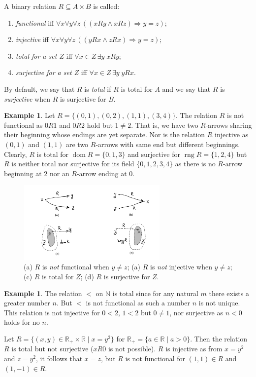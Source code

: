 \documentclass[12pt,notitlepage]{article}
\theoremstyle{plain}
\theoremstyle{definition}
\newtheorem{exm}[thm]{Example}
\theoremstyle{plain}
\newcommand{\N}{\mathbb{N}}
\newcommand{\R}{\mathbb{R}}
\newcommand{\sbs}{\subseteq}
\newcommand{\dom}{\mathop{\mathrm{dom}}}
\newcommand{\rng}{\mathop{\mathrm{rng}}}
\newcommand{\1}{\mathbf{1}}
\newcommand{\0}{\mathbf{0}}
\newcommand{\ply}{\Longrightarrow}
\begin{document}
A binary relation $R \sbs A \times B$ is called:
\begin{enumerate}
\item \emph{functional} iff $\forall x \forall y \forall z\, ( (x R y \wedge x R z) \ply y = z )$;
\item \emph{injective} iff $\forall x \forall y \forall z\, ( (y R x \wedge z R x) \ply y = z )$;
\item \emph{total for a set $Z$} iff $\forall x \in Z\, \exists y\; x R y$;
\item \emph{surjective for a set $Z$} iff $\forall x \in Z\, \exists y\; y R x$.
\end{enumerate}
By default, we say that $R$ is \emph{total} if $R$ is total for $A$ and we say that $R$ is \emph{surjective} when $R$ is surjective for $B$.

\begin{exm}
Let $R = \{(0,1), (0,2), (1,1), (3,4)\}$. The relation $R$ is not functional as $0 R 1$ and $0 R 2$ hold but $1 \neq 2$. That is, we have two $R$-arrows sharing their beginning whose endings are yet separate. Nor is the relation $R$ injective as $(0, 1)$ and $(1, 1)$ are two $R$-arrows with same end but different beginnings. Clearly, $R$ is total for $\dom R = \{0,1,3\}$ and surjective for $\rng R = \{1,2,4\}$ but $R$ is neither total nor surjective for its field $\{0,1,2,3,4\}$ as there is no $R$-arrow beginning at $2$ nor an $R$-arrow ending at $0$.
\end{exm}

\begin{figure}[h]
\centering
\includegraphics*[width=0.65\textwidth]{func_etc.pdf}
\caption{(a) $R$ is \emph{not} functional when $y \neq z$; (a) $R$ is \emph{not} injective when $y \neq z$; (c) $R$ is total for $Z$; (d) $R$ is surjective for $Z$.}
\end{figure}

 
\begin{exm}
The relation ${<}$ on $\N$ is total since for any natural $m$ there exists a greater number $n$. But ${<}$ is not functional as such a number $n$ is not unique. This relation is not injective for $0 < 2$, $1 < 2$ but $0 \neq 1$, nor surjective as $n < 0$ holds for no $n$. 

Let $R = \{(x,y) \in \R_{+} \times \R \mid x = y^2 \}$ for $\R_+ = \{a \in \R  \mid a > 0\}$. Then the relation $R$ is total but not surjective ($xR0$ is not possible). $R$ is injective as from $x = y^2$ and $z = y^2$, it follows that $x = z$, but $R$ is not functional for $(1, 1) \in R$ and $(1, -1) \in R$.
\end{exm}
\end{document}
